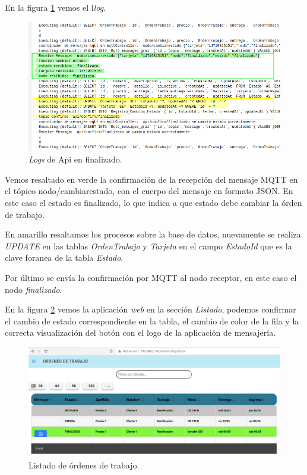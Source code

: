 En la figura \ref{fig:ensayofinalizadoapi} vemos el l\textit{log}.

\begin{figure}[H]
	\centering
	\includegraphics[width=\textwidth]{./Figures/ensayo-1/13.finalizado-api-logs.png}
	\caption{\textit{Logs} de Api en finalizado.}
	\label{fig:ensayofinalizadoapi}
\end{figure}

Vemos resaltado en verde la confirmación de la recepción del mensaje MQTT en el tópico nodo/cambiarestado, con el cuerpo del mensaje en formato JSON. En este caso el estado es finalizado, lo que indica a que estado debe cambiar la órden de trabajo.

En amarillo resaltamos los procesos sobre la base de datos, nuevamente se realiza \textit{UPDATE} en las tablas \textit{OrdenTrabajo} y \textit{Tarjeta} en el campo \textit{EstadoId} que es la clave foranea de la tabla \textit{Estado}.

Por último se envía la confirmación por MQTT al nodo receptor, en este caso el nodo \textit{finalizado}.

En la figura \ref{fig:ensayofinalizadolistado} vemos la aplicación \textit{web} en la sección \textit{Listado}, podemos confirmar el cambio de estado correspondiente en la tabla, el cambio de color de la fila y la correcta visualización del botón con el logo de la aplicación de mensajería.

\begin{figure}[H]
	\centering
	\includegraphics[width=\textwidth]{./Figures/ensayo-1/14.finalizado-listado.png}
	\caption{Listado de órdenes de trabajo.}
	\label{fig:ensayofinalizadolistado}
\end{figure}



